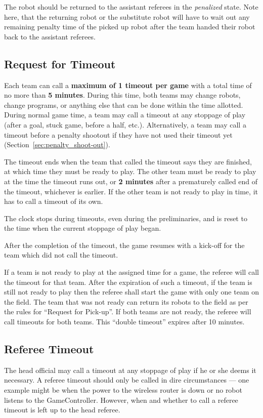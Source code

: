 The robot should be returned to the assistant referees in the \emph{penalized} state.
Note here, that the returning robot or the substitute robot will have to wait out any remaining penalty time of the picked up robot after the team handed their robot back to the assistant referees.

\subsection{Request for Timeout}
\label{sec:request_for_timeout}

Each team can call a \textbf{maximum of 1 timeout per game} with a total time of no more than \textbf{5 minutes}. During this time, both teams may change robots, change programs, or anything else that can be done within the time allotted.  During normal game time, a team may call a timeout at any stoppage of play (after a goal, stuck game, before a half, etc.). Alternatively, a team may call a timeout before a penalty shootout if they have not used their timeout yet (\cf Section~\ref{sec:penalty_shoot-out}).

The timeout ends when the team that called the timeout says they are finished, at which time they must be ready to play. The other team must be ready to play at the time the timeout runs out, or \textbf{2 minutes} after a prematurely called end of the timeout, whichever is earlier. If the other team is not ready to play in time, it has to call a timeout of its own.

The clock stops during timeouts, even during the preliminaries, and is reset to the time when the current stoppage of play began.

After the completion of the timeout, the game resumes with a kick-off for the team which did not call the timeout.

If a team is not ready to play at the assigned time for a game, the referee will call the timeout for that team. After the expiration of such a timeout, if the team is still not ready to play then the referee shall start the game with only one team on the field.  The team that was not ready can return its robots to the field as per the rules for ``Request for Pick-up''. If both teams are not ready, the referee will call timeouts for both teams. This ``double timeout'' expires after 10 minutes.

\subsection{Referee Timeout}
\label{sec:referee_timeout}
The head official may call a timeout at any stoppage of play if he or she deems it necessary.  A referee timeout should only be called in dire circumstances --- one example might be when the power to the wireless router is down or no robot listens to the GameController.  However, when and whether to call a referee timeout is left up to the head referee.

